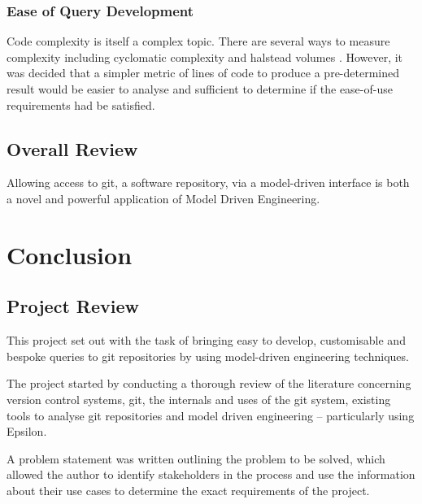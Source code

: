 \documentclass[11pt]{book}
\begin{document}

\subsection{Ease of Query Development}
Code complexity is itself a complex topic. There are several ways to measure complexity including cyclomatic complexity and halstead volumes \cite{halstead}. However, it was decided that a simpler metric of lines of code to produce a pre-determined result would be easier to analyse and sufficient to determine if the ease-of-use requirements had be satisfied.


\section{Overall Review}
Allowing access to git, a software repository, via a model-driven interface is both a novel and powerful application of Model Driven Engineering. 


\chapter{Conclusion}
\section{Project Review}
This project set out with the task of bringing easy to develop, customisable and bespoke queries to git repositories by using model-driven engineering techniques. 

The project started by conducting a thorough review of the literature concerning version control systems, git, the internals and uses of the git system, existing tools to analyse git repositories and model driven engineering -- particularly using Epsilon.

A problem statement was written outlining the problem to be solved, which allowed the author to identify stakeholders in the process and use the information about their use cases to determine the exact requirements of the project.
\end{document}
